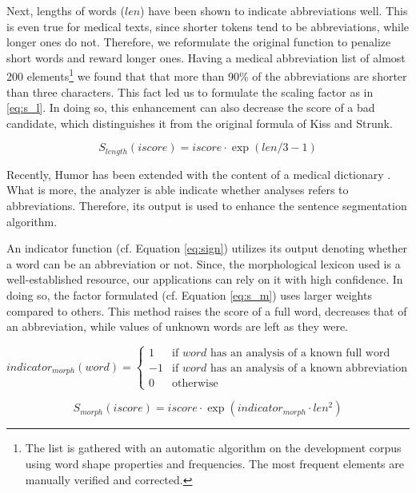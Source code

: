 Next, lengths of words ($len$) have been shown to indicate abbreviations well. 
This is even true for medical texts, since shorter tokens tend to be abbreviations, while longer ones do not. 
Therefore, we reformulate the original function to penalize short words and reward longer ones. 
Having a medical abbreviation list of almost 200 \label{sec:abbrev} elements\footnote{The list is gathered with an automatic algorithm on the development corpus using word shape properties and frequencies. The most frequent elements are manually verified and corrected.} 
we found that that more than 90\% of the abbreviations are shorter than three characters. 
This fact led us to formulate the scaling factor as in \eqref{eq:s_l}. 
In doing so, this enhancement can also decrease the score of a bad candidate, which distinguishes it from the original formula of Kiss and Strunk.

\begin{equation} \label{eq:s_l}
S_{length}(iscore)= iscore \cdot \exp{(len/3-1)}
\end{equation}

Recently, Humor \cite{Proszeky1994,Proszeky2005}  has been extended with the content of a medical dictionary \cite{Orosz2013}. 
What is more, the analyzer is able indicate whether analyses refers to abbreviations.
Therefore, its output is used to enhance the sentence segmentation algorithm.  

An indicator function (cf. Equation \ref{eq:sign}) utilizes its output denoting whether a word can be an abbreviation or not.
Since, the morphological lexicon used is a well-established resource, our applications can rely on it with high confidence.
In doing so, the factor formulated (cf. Equation \ref{eq:s_m}) uses larger weights compared to others. 
This method raises the score of a full word, decreases that of an abbreviation, while values of unknown words are left as they were.

\begin{equation}\label{eq:sign}
 indicator_{morph}(word) =
  \begin{cases}
   1  & \text{if $word$ has an analysis of a known full word} \\
   -1 & \text{if $word$ has an analysis of a known abbreviation} \\
   0  & \text{otherwise}
  \end{cases}
\end{equation}

\begin{equation} \label{eq:s_m}
S_{morph}(iscore)= iscore \cdot \exp{( indicator_{morph} \cdot len^2)}
\end{equation}

